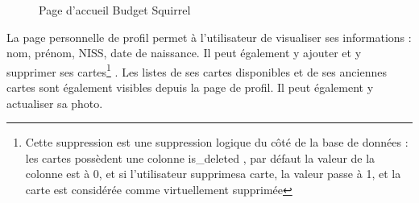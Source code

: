 \documentclass[a4paper,12pt]{article}
\begin{document}
\newpage
\begin{figure}[!ht]
\noindent
{}
\caption{\footnotesize{Page d'accueil Budget Squirrel}}
\end{figure}

\newpage
La page personnelle de profil permet à l'utilisateur de visualiser ses informations : nom, prénom, NISS, date de naissance. Il peut également y ajouter et y supprimer ses cartes\footnote{Cette suppression est une suppression logique du côté de la base de données : les cartes possèdent une colonne is\_deleted , par défaut la valeur de la colonne est à 0, et si l'utilisateur \og supprime\fg sa carte, la valeur passe à 1, et la carte est considérée comme virtuellement supprimée} . Les listes de ses cartes disponibles et de ses anciennes cartes sont également visibles depuis la page de profil. Il peut également y actualiser sa photo.
\end{document}
